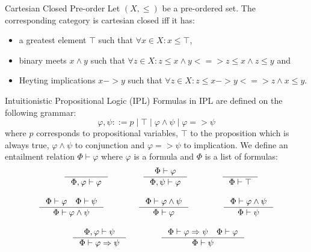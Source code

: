 \begin{definition}{Cartesian Closed Pre-order}
    Let $(X, \le)$ be a pre-ordered set.
    The corresponding category is cartesian closed iff it has:
    \begin{itemize}
        \item a greatest element $\top$ such that $\forall x \in X: x \le \top$,
        \item binary meets $x \land y$ such that $\forall z \in X: z \le x \land y <=> z \le x \land z \le y$ and
        \item Heyting implications $x -> y$ such that $\forall z \in X: z \le x -> y <=> z \land x \le y$.
    \end{itemize}
\end{definition}

\begin{definition}{Intuitionistic Propositional Logic (IPL)}
    Formulas in IPL are defined on the following grammar:
    \[\varphi, \psi ::= p \mid \top \mid \varphi \land \psi \mid \varphi => \psi\]
    where $p$ corresponds to propositional variables, $\top$ to the proposition which is always true,
    $\varphi \land \psi$ to conjunction and $\varphi => \psi$ to implication.
    We define an entailment relation $\Phi \vdash \varphi$ where $\varphi$ is a formula and $\Phi$ is a list of formulas:
    \begin{align*}
        & \qquad\quad \inference{}{\Phi, \varphi \vdash \varphi}\qquad\qquad
        \inference{\Phi \vdash \varphi}{\Phi, \psi \vdash \varphi}\qquad\qquad
        \inference{}{\Phi \vdash \top}\\[1em]
        & \inference{\Phi \vdash \varphi \quad \Phi \vdash \psi}{\Phi \vdash \varphi \land \psi}\qquad\qquad
        \inference{\Phi \vdash \varphi \land \psi}{\Phi \vdash \varphi}\qquad\qquad
        \inference{\Phi \vdash \varphi \land \psi}{\Phi \vdash \psi}\\[1em]
        & \qquad\qquad \inference{\Phi, \varphi \vdash \psi}{\Phi \vdash \varphi => \psi}\qquad\qquad
        \inference{\Phi \vdash \varphi => \psi \quad \Phi \vdash \varphi}{\Phi \vdash \psi}
    \end{align*}
\end{definition}

